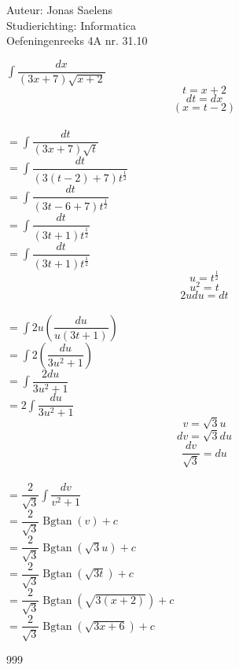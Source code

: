 \documentclass[a4paper]{article}
\begin{document}
\noindent \large Auteur: Jonas Saelens \\
\noindent \large Studierichting: Informatica\\
\noindent \large Oefeningenreeks 4A nr. 31.10\\

\medskip

\normalsize

$\displaystyle \int \dfrac{dx}{\left(3x+7\right)\sqrt{x+2}}$ \\

$$t = x+2$$ $$dt = dx$$ $$\left( x = t-2 \right)$$ \\

$= \displaystyle \int \dfrac{dt}{\left(3x+7\right)\sqrt{t}}$ \\

$= \displaystyle \int \dfrac{dt}{\left(3\left(t-2\right)+7\right)t^{\tfrac{1}{2}}}$ \\

$= \displaystyle \int \dfrac{dt}{\left(3t-6+7\right)t^{\tfrac{1}{2}}}$ \\

$= \displaystyle \int \dfrac{dt}{\left(3t+1\right)t^{\tfrac{1}{2}}}$ \\

$= \displaystyle \int \dfrac{dt}{\left(3t+1\right)t^{\tfrac{1}{2}}}$ \\

$$u = t^{\tfrac{1}{2}}$$ $$u^2 = t$$ $$2udu = dt$$ \\

$= \displaystyle \int 2u\left( \dfrac{du}{u\left(3t+1\right)}\right)$ \\

$= \displaystyle \int 2\left( \dfrac{du}{3u^2+1}\right)$ \\

$= \displaystyle \int \dfrac{2du}{3u^2+1}$ \\

$= \displaystyle 2 \int \dfrac{du}{3u^2+1}$ \\

$$v = \sqrt{3}u$$ $$dv = \sqrt{3}du$$ $$\dfrac{dv}{\sqrt{3}} = du$$ \\

$= \dfrac{2}{\sqrt{3}} \displaystyle \int \dfrac{dv}{v^2+1}$ \\

$= \dfrac{2}{\sqrt{3}} \operatorname{Bgtan}(v)+c$ \\

$= \dfrac{2}{\sqrt{3}} \operatorname{Bgtan}(\sqrt{3}u)+c$ \\

$= \dfrac{2}{\sqrt{3}} \operatorname{Bgtan}(\sqrt{3t})+c$ \\

$= \dfrac{2}{\sqrt{3}} \operatorname{Bgtan}(\sqrt{3(x+2)})+c$ \\

$= \dfrac{2}{\sqrt{3}} \operatorname{Bgtan}(\sqrt{3x+6})+c$ \\

\begin{thebibliography}{999}
\end{thebibliography}
\end{document}
